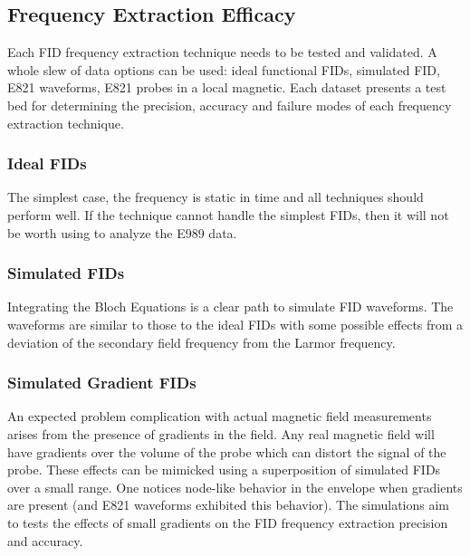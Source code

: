 
\subsection{Frequency Extraction Efficacy}

Each FID frequency extraction technique needs to be tested and validated.  A whole slew of data options can be used: ideal functional FIDs, simulated FID, E821 waveforms, E821 probes in a local \uw magnetic.  Each dataset presents a test bed for determining the precision, accuracy and failure modes of each frequency extraction technique.

\subsubsection{Ideal FIDs}
The simplest case, the frequency is static in time and all techniques should perform well.  If the technique cannot handle the simplest FIDs, then it will not be worth using to analyze the E989 data.


\subsubsection{Simulated FIDs}
Integrating the Bloch Equations is a clear path to simulate FID waveforms.  The waveforms are similar to those to the ideal FIDs with some possible effects from a deviation of the secondary field frequency from the Larmor frequency.  


\subsubsection{Simulated Gradient FIDs}
An expected problem complication with actual magnetic field measurements arises from the presence of gradients in the field.  Any real magnetic field will have gradients over the volume of the probe which can distort the signal of the probe.  These effects can be mimicked using a superposition of simulated FIDs over a small range.  One notices node-like behavior in the envelope when gradients are present (and E821 waveforms exhibited this behavior).  The simulations aim to tests the effects of small gradients on the FID frequency extraction precision and accuracy.


